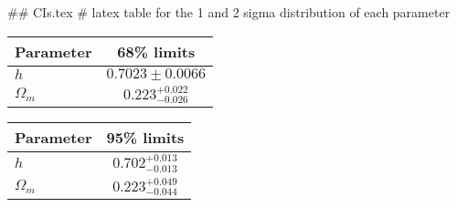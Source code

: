 ## CIs.tex
# latex table for the 1 and 2 sigma distribution of each parameter

\begin{tabular} { l  c}
 Parameter &  68\% limits\\
\hline
{\boldmath$h              $} & $0.7023\pm 0.0066          $\\
{\boldmath$\Omega_m       $} & $0.223^{+0.022}_{-0.026}   $\\
\hline
\end{tabular}

\begin{tabular} { l  c}
 Parameter &  95\% limits\\
\hline
{\boldmath$h              $} & $0.702^{+0.013}_{-0.013}   $\\
{\boldmath$\Omega_m       $} & $0.223^{+0.049}_{-0.044}   $\\
\hline
\end{tabular}
